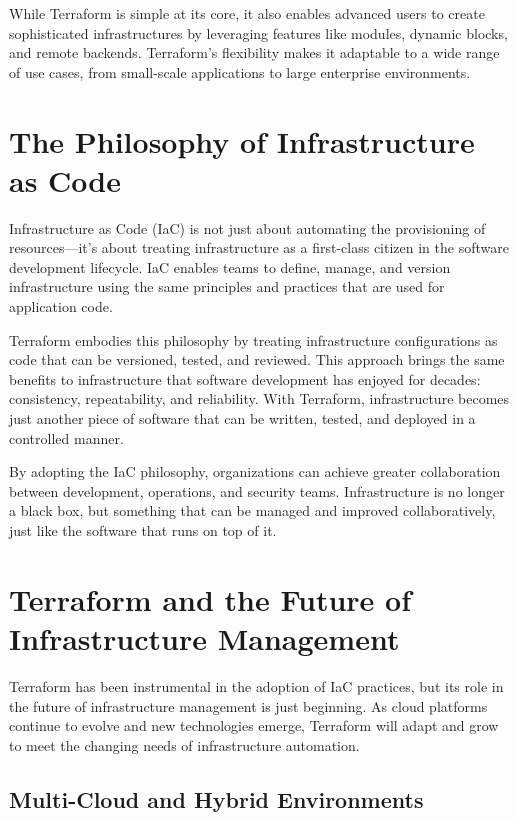 While Terraform is simple at its core, it also enables advanced users to create sophisticated infrastructures by leveraging features like modules, dynamic blocks, and remote backends. Terraform's flexibility makes it adaptable to a wide range of use cases, from small-scale applications to large enterprise environments.

\section{The Philosophy of Infrastructure as Code}

Infrastructure as Code (IaC) is not just about automating the provisioning of resources—it's about treating infrastructure as a first-class citizen in the software development lifecycle. IaC enables teams to define, manage, and version infrastructure using the same principles and practices that are used for application code.

Terraform embodies this philosophy by treating infrastructure configurations as code that can be versioned, tested, and reviewed. This approach brings the same benefits to infrastructure that software development has enjoyed for decades: consistency, repeatability, and reliability. With Terraform, infrastructure becomes just another piece of software that can be written, tested, and deployed in a controlled manner.

By adopting the IaC philosophy, organizations can achieve greater collaboration between development, operations, and security teams. Infrastructure is no longer a black box, but something that can be managed and improved collaboratively, just like the software that runs on top of it.

\section{Terraform and the Future of Infrastructure Management}

Terraform has been instrumental in the adoption of IaC practices, but its role in the future of infrastructure management is just beginning. As cloud platforms continue to evolve and new technologies emerge, Terraform will adapt and grow to meet the changing needs of infrastructure automation.

\subsection{Multi-Cloud and Hybrid Environments}

